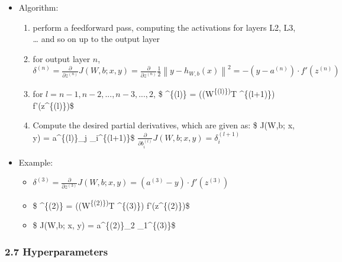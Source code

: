 \documentclass[11pt]{article}
\providecommand{\tightlist}{%
      \setlength{\itemsep}{0pt}\setlength{\parskip}{0pt}}
\begin{document}
\begin{itemize}
\tightlist
\item
  Algorithm:

  \begin{enumerate}
  \def\labelenumi{\arabic{enumi}.}
  \tightlist
  \item
    perform a feedforward pass, computing the activations for layers L2,
    L3, \ldots{} and so on up to the output layer
  \item
    for output layer \(n\),
    \(\delta^{(n)} = \frac{\partial}{\partial z^{(n)}}  J(W,b; x, y) = \frac{\partial}{\partial z^{(n)}}  \frac{1}{2} \left\|y - h_{W,b}(x)\right\|^2 = - (y - a^{(n)}) \cdot f'(z^{(n)})\)
  \item
    for \(l=n-1, n-2, ..., n-3, ..., 2\), \$ \delta\^{}\{(l)\} =
    \left((W\textsuperscript{\{(l)\})}T \delta\^{}\{(l+1)\}\right)
    \cdot f'(z\^{}\{(l)\})\$
  \item
    Compute the desired partial derivatives, which are given as: \$
     J(W,b; x, y) =
    a\^{}\{(l)\}\_j \delta\_i\^{}\{(l+1)\}\$
    \(\frac{\partial}{\partial b_{i}^{(l)}} J(W,b; x, y) = \delta_i^{(l+1)}\)
  \end{enumerate}
\item
  Example:

  \begin{itemize}
  \item
    \(\delta^{(3)} = \frac{\partial}{\partial z^{(3)}} J(W,b; x, y) = (a^{(3)} - y) \cdot f'(z^{(3)})\)
  \item
    \$ \delta\^{}\{(2)\} = \left((W\textsuperscript{\{(2)\})}T
    \delta\^{}\{(3)\}\right) \cdot f'(z\^{}\{(2)\})\$
  \item
    \$  J(W,b; x, y) =
    a\^{}\{(2)\}\_2 \delta\_1\^{}\{(3)\}\$
  \end{itemize}
\end{itemize}

    \hypertarget{hyperparameters}{%
\subsubsection{2.7 Hyperparameters}\label{hyperparameters}}
\end{document}
